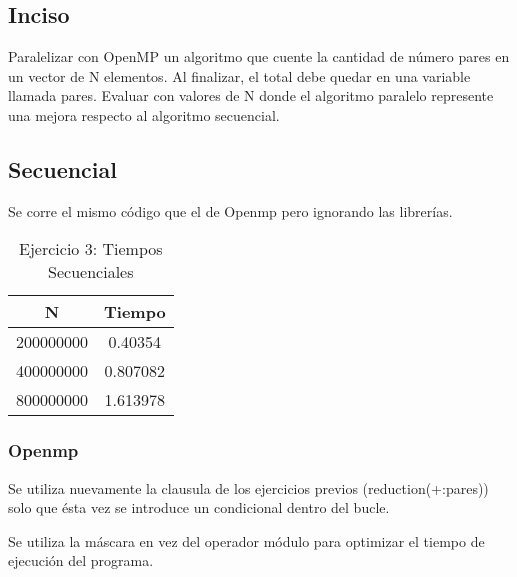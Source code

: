 \subsection{Inciso}

Paralelizar con OpenMP un algoritmo que cuente la cantidad de número pares en un vector de N elementos. Al finalizar, el total debe quedar en una variable llamada pares.
Evaluar con valores de N donde el algoritmo paralelo represente una mejora respecto al algoritmo secuencial.

\subsection{Secuencial}

Se corre el mismo código que el de Openmp pero ignorando las librerías.


\begin{table}[htbp]
\centering
\caption{Ejercicio 3: Tiempos Secuenciales}
\begin{tabular}{|c|c|}
\hline
\textbf{N} & \textbf{Tiempo} \\ \hline
200000000  & 0.40354         \\ \hline
400000000  & 0.807082        \\ \hline
800000000  & 1.613978        \\ \hline
\end{tabular}
\end{table}

\subsubsection{Openmp}

Se utiliza nuevamente la clausula de los ejercicios previos (reduction(+:pares)) solo que ésta vez se introduce un condicional dentro del bucle.


Se utiliza la máscara en vez del operador módulo para optimizar el tiempo de ejecución del programa.

